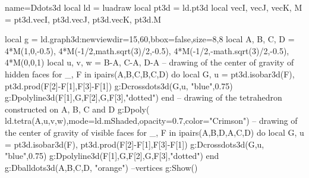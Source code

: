 \begin{luadraw}{name=Ddots3d}
local ld = luadraw
local pt3d = ld.pt3d
local vecI, vecJ, vecK, M = pt3d.vecI, pt3d.vecJ, pt3d.vecK, pt3d.M

local g = ld.graph3d:new{viewdir={15,60},bbox=false,size={8,8}}
local A, B, C, D = 4*M(1,0,-0.5), 4*M(-1/2,math.sqrt(3)/2,-0.5), 4*M(-1/2,-math.sqrt(3)/2,-0.5), 4*M(0,0,1)
local u, v, w = B-A, C-A, D-A
-- drawing of the center of gravity of hidden faces
for _, F in ipairs({{A,B,C},{B,C,D}}) do
local G, u = pt3d.isobar3d(F), pt3d.prod(F[2]-F[1],F[3]-F[1])
g:Dcrossdots3d({G,u}, "blue",0.75)
g:Dpolyline3d({{F[1],G,F[2]},{G,F[3]}},"dotted")
end
-- drawing of the tetrahedron constructed on A, B, C and D
g:Dpoly( ld.tetra(A,u,v,w),{mode=ld.mShaded,opacity=0.7,color="Crimson"})
-- drawing of the center of gravity of visible faces
for _, F in ipairs({{A,B,D},{A,C,D}}) do
    local G, u = pt3d.isobar3d(F), pt3d.prod(F[2]-F[1],F[3]-F[1])
    g:Dcrossdots3d({G,u}, "blue",0.75)
    g:Dpolyline3d({{F[1],G,F[2]},{G,F[3]}},"dotted")
end
g:Dballdots3d({A,B,C,D}, "orange") --vertices
g:Show()
\end{luadraw}
